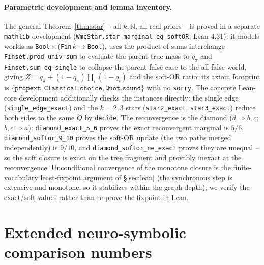 \documentclass[anon]{nesy2026}
\begin{document}
\paragraph{Parametric development and lemma inventory.}
The general Theorem~\ref{thm:star} -- all $k:\mathbb{N}$, all real priors -- is proved in a
separate \texttt{mathlib} development (\texttt{WmcStar.star\_marginal\_eq\_softOR}, Lean 4.31):
it models worlds as \texttt{Bool}\,$\times$\,(\texttt{Fin}\,$k\to$\texttt{Bool}), uses the
product-of-sums interchange \texttt{Finset.prod\_univ\_sum} to evaluate the parent-true mass to
$q_\pi$ and \texttt{Finset.sum\_eq\_single} to collapse the parent-false case to the all-false
world, giving $Z=q_\pi+(1-q_\pi)\prod_i(1-q_i)$ and the soft-OR ratio; its axiom footprint is
$\{\texttt{propext},\texttt{Classical.choice},\texttt{Quot.sound}\}$ with no \texttt{sorry}. The
concrete Lean-core development additionally checks the instances directly: the single edge
(\texttt{single\_edge\_exact}) and the $k{=}2,3$ stars (\texttt{star2\_exact},
\texttt{star3\_exact}) reduce both sides to the same $Q$ by \texttt{decide}. The reconvergence is the diamond
($d\!\Rightarrow\!b,c$; $b,c\!\Rightarrow\!a$): \texttt{diamond\_exact\_5\_6} proves the exact
reconvergent marginal is $5/6$, \texttt{diamond\_softor\_9\_10} proves the soft-OR update (the
two paths merged independently) is $9/10$, and \texttt{diamond\_softor\_ne\_exact} proves they
are unequal -- so the soft closure is exact on the tree fragment and provably inexact at the
reconvergence. Unconditional convergence of the monotone closure is the finite-vocabulary
least-fixpoint argument of \S\ref{sec:lean} (the synchronous step is extensive and monotone, so
it stabilizes within the graph depth); we verify the exact/soft values rather than re-prove the
fixpoint in Lean.

\section{Extended neuro-symbolic comparison numbers}\label{app:nesy}
\end{document}
